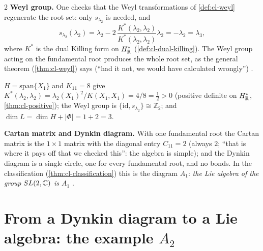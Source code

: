 \begin{paracol}{2}
\textbf{Weyl group.} One checks that the Weyl transformations of \cref{def:cl-weyl} regenerate the root set: only $s_{\lambda_2}$ is needed, and
\[
  s_{\lambda_2}(\lambda_2)=\lambda_2-2\,\frac{K^*(\lambda_2,\lambda_2)}{K^*(\lambda_2,\lambda_2)}\lambda_2=-\lambda_2=\lambda_3,
\]
where $K^*$ is the dual Killing form on $H^*_{\mathbb{R}}$ (\cref{def:cl-dual-killing}). The Weyl group acting on the fundamental root produces the whole root set, as the general theorem (\cref{thm:cl-weyl}) says (``had it not, we would have calculated wrongly'')        .
\begin{coursenote}
$H=\mathrm{span}\{X_1\}$ and $K_{11}=8$ give $K^*(\lambda_2,\lambda_2)=\lambda_2(X_1)^2/K(X_1,X_1)=4/8=\tfrac12>0$ (positive definite on $H^*_{\mathbb{R}}$, \cref{thm:cl-positive}); the Weyl group is $\{\mathrm{id},s_{\lambda_2}\}\cong\mathbb Z_2$; and $\dim L=\dim H+|\Phi|=1+2=3$. 
\end{coursenote}
\textbf{Cartan matrix and Dynkin diagram.} With one fundamental root the Cartan matrix is the $1\times1$ matrix with the diagonal entry $C_{11}=2$ (always $2$; ``that is where it pays off that we checked this'': the algebra is simple); and the Dynkin diagram is a single circle, one for every fundamental root, and no bonds. In the classification (\cref{thm:cl-classification}) this is the diagram $A_1$: \emph{the Lie algebra of the group $SL(2,\mathbb{C})$ is $A_1$}    .
\begin{center}
\end{center}

\section{From a Dynkin diagram to a Lie algebra: the example $A_2$}\label{sec:sa-a2}


\end{paracol}
